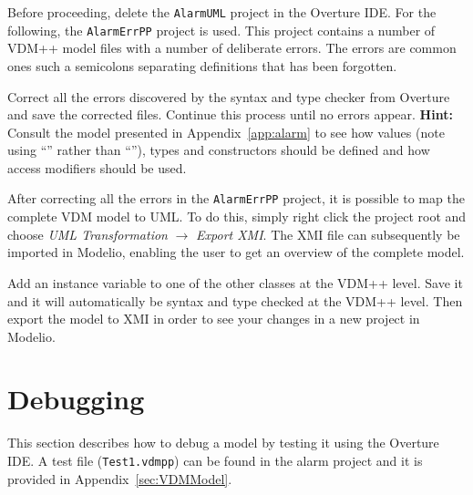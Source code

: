 Before proceeding, delete the \texttt{AlarmUML} project in the Overture IDE.
For the following, the \texttt{AlarmErrPP} project is used. This project contains
a number of VDM++ model files with a number of
deliberate errors.  The errors are common ones such a
semicolons separating definitions that has been forgotten.

\begin{myexercise}\label{ex:type-errors}
Correct all the errors discovered by the syntax and type checker from
Overture and save the corrected files. Continue this process until no errors appear.
\textbf{Hint:} Consult the model presented in
Appendix~\ref{app:alarm}
to see how values (note using ``\vdmstyle{=}'' rather than
``\vdmstyle{:=}''), types and constructors should be defined and how
access modifiers should be used.
\end{myexercise}


After correcting all the errors in the \texttt{AlarmErrPP} project, it is possible
to map the complete VDM model to UML. To do this, simply right
click the project root and choose \emph{UML Transformation} $
\rightarrow $ \emph{Export XMI}. The XMI file can subsequently be
imported in Modelio, enabling the user to get an overview
of the complete model.

\begin{myexercise}\label{ex:rosemapping}
Add an instance variable to one of the other classes at the VDM++
level. Save it and it will automatically be syntax and type checked at
the VDM++ level. Then export the model to XMI in order to see your
changes in a new project in Modelio.
\end{myexercise}



\section{Debugging}\label{sec:debugging}

This section describes how to debug a model by testing it using the
Overture IDE. A test file (\texttt{Test1.vdmpp}) can be
found in the alarm project and it is provided in
Appendix~\ref{sec:VDMModel}.

\lstset{language=VDM++}
%

